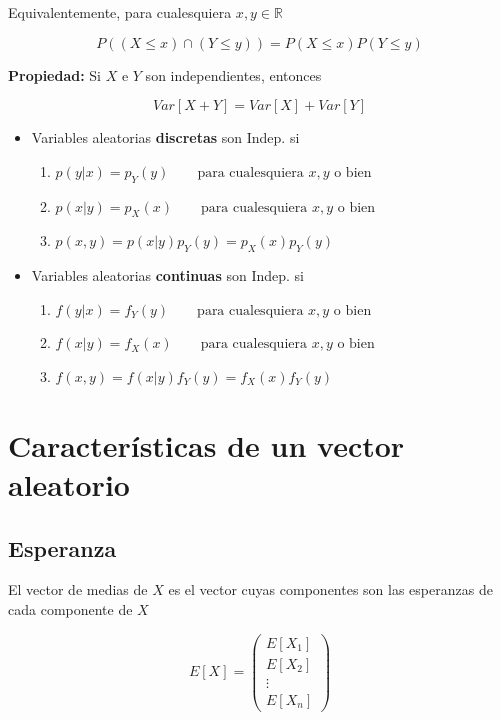 \documentclass{article}
\begin{document}
Equivalentemente, para cualesquiera $x, y \in \mathbb{R}$

\[ P((X \leq x) \cap (Y \leq y)) = P(X \leq x)P(Y \leq y) \]

\newpage

\textbf{Propiedad:} Si $X$ e $Y$ son independientes, entonces

\[ Var[X + Y] = Var[X] + Var[Y] \]

\begin{itemize}
    \item Variables aleatorias \textbf{discretas} son Indep. si
    \begin{enumerate}
        \item $p(y | x) = p_{Y}(y) \qquad \text{para cualesquiera $x, y$ o bien}$
        \item $p(x | y) = p_{X}(x) \qquad \text{para cualesquiera $x, y$ o bien}$
        \item $p(x, y) = p(x | y)p_{Y}(y) = p_{X}(x)p_{Y}(y) $
    \end{enumerate}
    \item Variables aleatorias \textbf{continuas} son Indep. si
    \begin{enumerate}
        \item $f(y | x) = f_{Y}(y) \qquad \text{para cualesquiera $x, y$ o bien}$
        \item $f(x | y) = f_{X}(x) \qquad \text{para cualesquiera $x, y$ o bien}$
        \item $f(x, y) = f(x | y)f_{Y}(y) = f_{X}(x)f_{Y}(y) $
    \end{enumerate}
\end{itemize}


\section{Características de un vector aleatorio}


\subsection{Esperanza}

El vector de medias de $X$ es el vector cuyas componentes son las esperanzas de cada componente de $X$

\[ E[X] = \left( \begin{matrix}
    E[X_1] \\
    E[X_2] \\
    \vdots \\
    E[X_n] 
\end{matrix} \right) \]
\end{document}
